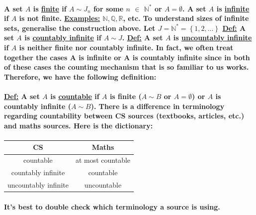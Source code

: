 \documentclass[10pt,a4paper]{article}
\begin{document}
\paragraph{A set $A$ is \underline{finite} if $A \sim J_{n}$ for some $n$ $ \in $    $ \mathbb{N}^{*}$ or $A = \emptyset$.\newline
A set $A$ is \underline{infinite} if $A$ is not finite.\newline
\underline{Examples:} $\mathbb{N,Q,R}$, etc. \newline 
To understand sizes of infinite sets, generalise the construction above. Let $J = \mathbb{N^{*}} = \left\lbrace1,2,...\right\rbrace$ \newline
\underline{Def:} A set $A$ is \underline{countably infinite} if $A \sim J$. \newline
\underline{Def:} A set $A$ is \underline{uncountably infinite} if $A$ is neither finite nor countably infinite.\newline
In fact, we often treat together the cases A is infinite or A is countably infinite since in both of these cases the counting mechanism that is so familiar to us works. Therefore, we have the following definition:}

\paragraph{\underline{Def:} A set $A$ is \underline{countable} if $A$ is finite ($A \sim B$ or $A = \emptyset$) or $A$ is countably infinite ($A \sim B$).\newline
There is a difference in terminology regarding countability between CS sources (textbooks, articles, etc.) and maths sources. Here is the dictionary:
}
\paragraph{}
\normalsize
 \begin{table}[ht]
 \centering
\begin{tabular}{|c|c|}
\hline 
CS & Maths \\ 
\hline 
countable & at most countable \\ 
\hline 
countably infinite & countable \\ 
\hline 
uncountably infinite & uncountable \\ 
\hline 
\end{tabular}
\end{table}

\paragraph{It's best to double check which terminology a source is using.\newline}
\end{document}
